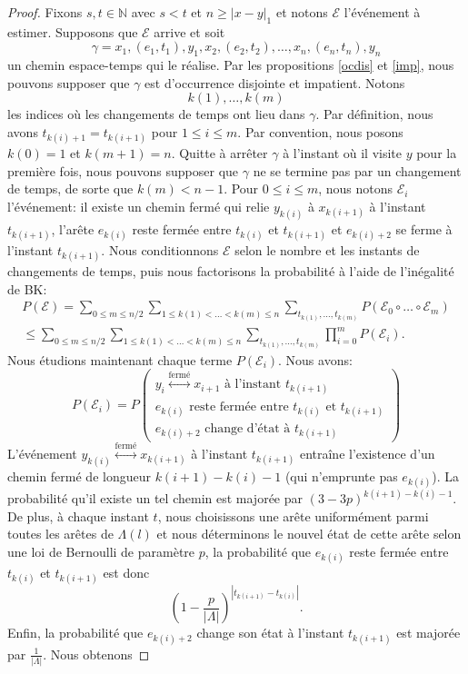 \documentclass[titlepage,a4paper,12pt]{article}
\newcounter{d}
\newcounter{t}
\newcounter{p}
\newcounter{c}
\newcounter{a}
\newcounter{l}
\begin{document}
\begin{proof}
Fixons $s,t\in \mathbb{N}$ avec $s< t$ et $n\geqslant |x-y|_1$ et notons $\mathcal{E}$ l'événement à estimer. Supposons que $\mathcal{E}$ arrive et soit 
$$\gamma= x_1,(e_1,t_1), y_1, x_2,(e_2,t_2),\dots,x_n,(e_n,t_n),y_n$$ un chemin espace-temps qui le réalise. Par les propositions \ref{ocdis} et \ref{imp}, nous pouvons supposer que $\gamma$ est d'occurrence disjointe et impatient. Notons $$k(1),\dots,k(m)$$ les indices où les changements de temps ont lieu dans $\gamma$. Par définition, nous avons 
$t_{k(i)+1} = t_{k(i+1)}$ pour $1\leqslant i \leqslant m$. Par convention, nous posons $k(0) = 1$ et $k(m+1)=n$. Quitte à arrêter $\gamma$ à l'instant où il visite $y$ pour la première fois, nous pouvons supposer que $\gamma$ ne se termine pas par un changement de temps, de sorte que $k(m)< n-1$. Pour $0\leqslant i \leqslant m$, nous notons $\mathcal{E}_i$ l'événement: il existe un chemin fermé qui relie $y_{k(i)}$ à $x_{k(i+1)}$  à l'instant $t_{k(i+1)}$, l'arête $e_{k(i)}$ reste fermée entre $t_{k(i)}$ et $t_{k(i+1)}$ et $e_{k(i)+2}$ se ferme à l'instant $t_{k(i+1)}$. Nous conditionnons $\mathcal{E}$ selon le nombre et les instants de changements de temps, puis nous factorisons la probabilité à l'aide de l'inégalité de BK:
\begin{multline*}
P(\mathcal{E})
= \sum_{0\leqslant m \leqslant n/2}\sum_{1\leqslant k(1)<\dots<k(m)\leqslant n}\sum_{t_{k(1)},\dots,t_{k(m)}}P(\mathcal{E}_0\circ\dots\circ \mathcal{E}_m)\\
\leqslant \sum_{0\leqslant m \leqslant n/2}\sum_{1\leqslant k(1)<\dots<k(m)\leqslant n}\sum_{t_{k(1)},\dots,t_{k(m)}} \prod_{i=0}^mP(\mathcal{E}_i).
\end{multline*}
Nous étudions maintenant chaque terme $P(\mathcal{E}_i)$. Nous avons:
$$
P(\mathcal{E}_i) = P\left(\begin{array}{c}
y_i\overset{\text{fermé}}{\longleftrightarrow} x_{i+1}\text{ à l'instant }t_{k(i+1)}\\
e_{k(i)} \text{ reste fermée entre } t_{k(i)} \text{ et } t_{k(i+1)}\\
e_{k(i)+2} \text{ change d'état à }t_{k(i+1)}
\end{array}\right)
$$
L'événement $y_{k(i)}\overset{\text{fermé}}{\longleftrightarrow} x_{k(i+1)}$ à l'instant $t_{k(i+1)}$ entraîne l'existence d'un chemin fermé de longueur $k(i+1)-k(i)-1$ (qui n'emprunte pas $e_{k(i)}$). La probabilité qu'il existe un tel chemin est majorée par $(3-3p)^{k(i+1)-k(i)-1}$.
De plus, à chaque instant $t$, nous choisissons une arête uniformément parmi toutes les arêtes de $\Lambda(l)$ et nous déterminons le nouvel état de cette arête selon une loi de Bernoulli  de paramètre $p$, la probabilité que $e_{k(i)}$ reste fermée entre $t_{k(i)}$ et $t_{k(i+1)}$ est donc $$\left(1-\frac{p}{|\Lambda|}\right)^{|t_{k(i+1)}-t_{k(i)}|}.$$ Enfin, la probabilité que $e_{k(i)+2}$ change son état à l'instant $t_{k(i+1)}$ est majorée par $\frac{1}{|\Lambda|}$. Nous obtenons

\end{proof}
\end{document}

